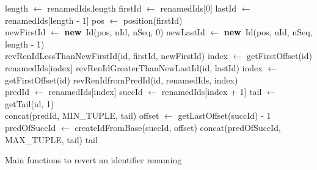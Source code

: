 \documentclass[10pt,journal,compsoc]{IEEEtran}
\let\MYoriglatexcaption\caption
\renewcommand{\caption}[2][\relax]{\MYoriglatexcaption[#2]{#2}}
\newcommand{\new}{\textbf{new}}
\begin{document}
\begin{myalgorithm}[!ht]
    \footnotesize
    \begin{algorithmic}
            \State length $\gets$ renamedIds.length
            \State firstId $\gets$ renamedIds[0]
            \State lastId $\gets$ renamedIds[length - 1]
            \State pos $\gets$ position(firstId)
            \\
            \State newFirstId $\gets$ \new~Id(pos, nId, nSeq, 0)
            \State newLastId $\gets$ \new~Id(pos, nId, nSeq, length - 1)
            \\
                \State \Return revRenIdLessThanNewFirstId(id, firstId, newFirstId)
                \State index $\gets$ getFirstOffset(id)
                \State \Return renamedIds[index]
                \State \Return revRenIdGreaterThanNewLastId(id, lastId)
            \Else
                \State index $\gets$ getFirstOffset(id)
                \State \Return revRenIdfromPredId(id, renamedIds, index)
            \EndIf
        \EndFunction
        \\
            \State predId $\gets$ renamedIds[index]
            \State succId $\gets$ renamedIds[index + 1]
            \State tail $\gets$ getTail(id, 1)
            \\
                \State {}
                \State \Return concat(predId, MIN\_TUPLE, tail)
                \State {}
                \State offset $\gets$ getLastOffset(succId) - 1
                \State predOfSuccId $\gets$ createIdFromBase(succId, offset)
                \State \Return concat(predOfSuccId, MAX\_TUPLE, tail)
            \Else
                \State \Return tail
            \EndIf
        \EndFunction
    \end{algorithmic}
    \caption{Main functions to revert an identifier renaming}
    \label{alg:revertRenameId}
\end{myalgorithm}
\end{document}
